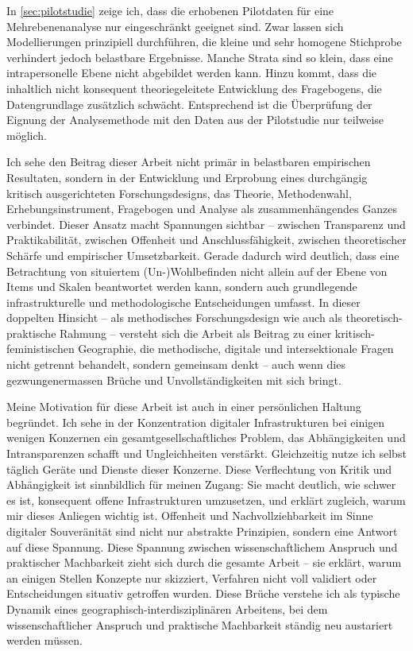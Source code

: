 In \cref{sec:pilotstudie} zeige ich, dass die erhobenen Pilotdaten für eine  Mehrebenenanalyse nur eingeschränkt geeignet sind. Zwar lassen sich Modellierungen prinzipiell durchführen, die kleine und sehr homogene Stichprobe verhindert jedoch belastbare Ergebnisse. Manche Strata sind so klein, dass eine intrapersonelle Ebene nicht abgebildet werden kann. Hinzu kommt, dass die inhaltlich nicht konsequent theoriegeleitete Entwicklung des Fragebogens, die Datengrundlage zusätzlich schwächt. Entsprechend ist die Überprüfung der Eignung der Analysemethode mit den Daten aus der Pilotstudie nur teilweise möglich.

Ich sehe den Beitrag dieser Arbeit nicht primär in belastbaren empirischen Resultaten, sondern in der Entwicklung und Erprobung eines durchgängig kritisch ausgerichteten Forschungsdesigns, das Theorie, Methodenwahl, Erhebungsinstrument, Fragebogen und Analyse als zusammenhängendes Ganzes verbindet. Dieser Ansatz macht Spannungen sichtbar -- zwischen Transparenz und Praktikabilität, zwischen Offenheit und Anschlussfähigkeit, zwischen theoretischer Schärfe und empirischer Umsetzbarkeit. Gerade dadurch wird deutlich, dass eine  Betrachtung von situiertem (Un-)Wohlbefinden nicht allein auf der Ebene von Items und Skalen beantwortet werden kann, sondern auch grundlegende infrastrukturelle und methodologische Entscheidungen umfasst. In dieser doppelten Hinsicht -- als methodisches Forschungsdesign wie auch als theoretisch-praktische Rahmung -- versteht sich die Arbeit als Beitrag zu einer kritisch-feministischen Geographie, die methodische, digitale und intersektionale Fragen nicht getrennt behandelt, sondern gemeinsam denkt -- auch wenn dies gezwungenermassen Brüche und Unvollständigkeiten mit sich bringt.

Meine Motivation für diese Arbeit ist auch in einer persönlichen Haltung begründet. Ich sehe in der Konzentration digitaler Infrastrukturen bei einigen wenigen Konzernen ein gesamtgesellschaftliches Problem, das Abhängigkeiten und Intransparenzen schafft und Ungleichheiten verstärkt. Gleichzeitig nutze ich selbst täglich Geräte und Dienste dieser Konzerne. Diese Verflechtung von Kritik und Abhängigkeit ist sinnbildlich für meinen Zugang: Sie macht deutlich, wie schwer es ist, konsequent offene Infrastrukturen umzusetzen, und erklärt zugleich, warum mir dieses Anliegen wichtig ist. Offenheit und Nachvollziehbarkeit im Sinne digitaler Souveränität sind nicht nur abstrakte Prinzipien, sondern eine Antwort auf diese Spannung. Diese Spannung zwischen wissenschaftlichem Anspruch und praktischer Machbarkeit zieht sich durch die gesamte Arbeit -- sie erklärt, warum an einigen Stellen Konzepte nur skizziert, Verfahren nicht voll validiert oder Entscheidungen situativ getroffen wurden. Diese Brüche verstehe ich als typische Dynamik eines geographisch-interdisziplinären Arbeitens, bei dem wissenschaftlicher Anspruch und praktische Machbarkeit ständig neu austariert werden müssen.

